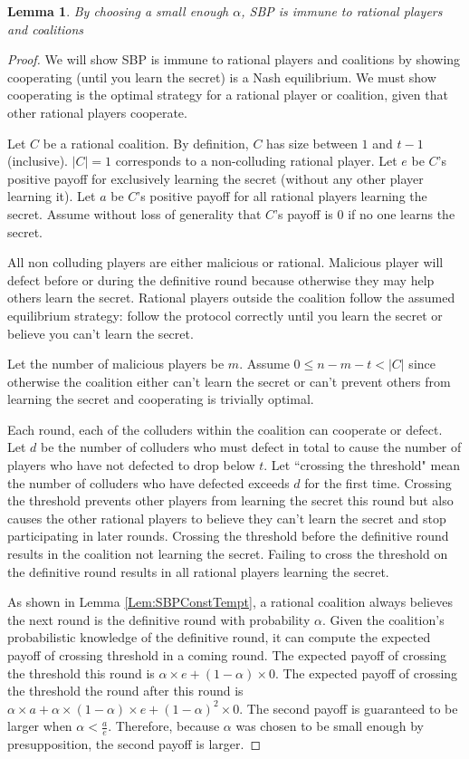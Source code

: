\documentclass{dalcsthesis}
\newtheorem{lemma}{Lemma}
\begin{document}
\begin{lemma} By choosing a small enough $\alpha$, SBP is immune to rational players and coalitions \label{Lem:SBPRatNash} \end{lemma}
\begin{proof}
We will show SBP is immune to rational players and coalitions by showing cooperating (until you learn the secret) is a Nash equilibrium. We must show cooperating is the optimal strategy for a rational player or coalition, given that other rational players cooperate.

Let $C$ be a rational coalition. By definition, $C$ has size between $1$ and $t-1$ (inclusive). $|C| = 1$ corresponds to a non-colluding rational player. Let $e$ be $C$'s positive payoff for exclusively learning the secret (without any other player learning it). Let $a$ be $C$'s positive payoff for all rational players learning the secret. Assume without loss of generality that $C$'s payoff is 0 if no one learns the secret.

All non colluding players are either malicious or rational. Malicious player will defect before or during the definitive round because otherwise they may help others learn the secret. Rational players outside the coalition follow the assumed equilibrium strategy: follow the protocol correctly until you learn the secret or believe you can't learn the secret.

Let the number of malicious players be $m$. Assume $0 \leq n - m - t < |C|$ since otherwise the coalition either can't learn the secret or can't prevent others from learning the secret and cooperating is trivially optimal.

Each round, each of the colluders within the coalition can cooperate or defect. Let $d$ be the number of colluders who must defect in total to cause the number of players who have not defected to drop below $t$. Let ``crossing the threshold" mean the number of colluders who have defected exceeds $d$ for the first time. Crossing the threshold prevents other players from learning the secret this round but also causes the other rational players to believe they can't learn the secret and stop participating in later rounds. Crossing the threshold before the definitive round results in the coalition not learning the secret. Failing to cross the threshold on the definitive round results in all rational players learning the secret.

As shown in Lemma \ref{Lem:SBPConstTempt}, a rational coalition always believes the next round is the definitive round with probability $\alpha$. Given the coalition's probabilistic knowledge of the definitive round, it can compute the expected payoff of crossing threshold in a coming round. The expected payoff of crossing the threshold this round is $\alpha \times e + (1-\alpha) \times 0$. The expected payoff of crossing the threshold the round after this round is $\alpha \times a + \alpha \times (1-\alpha) \times e + (1-\alpha)^2 \times 0$. The second payoff is guaranteed to be larger when $\alpha < \frac{a}{e}$. Therefore, because $\alpha$ was chosen to be small enough by presupposition, the second payoff is larger.


\end{proof}
\end{document}

